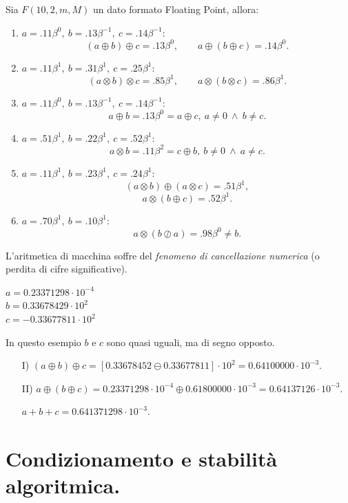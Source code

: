 \begin{exe}
Sia $F(10,2,m,M)$ un dato formato Floating Point, allora:
\begin{enumerate}
\item $a = .11\beta^0,\ b = .13\beta^{-1}, \ c = .14\beta^{-1}$:
\[(a \oplus b) \oplus c = .13\beta^0, \qquad a \oplus (b \oplus c) = .
14\beta^0.\]
\item $a = .11\beta^1,\ b = .31\beta^{1}, \ c = .25\beta^{1}$:
\[(a \otimes b) \otimes c = .85\beta^1, \qquad a \otimes (b \otimes c) = .
86\beta^1.\]
\item $a = .11\beta^0,\ b = .13\beta^{-1}, \ c = .14\beta^{-1}$:
\[a \oplus b = .13\beta^0 = a \oplus c, \ a \neq 0 \ \wedge\ b \neq c.\]
\item $a = .51\beta^1,\ b = .22\beta^{1}, \ c = .52\beta^{1}$:
\[a \otimes b = .11\beta^2 = c \oplus b, \ b \neq 0 \ \wedge\ a \neq c.\]
\item $a = .11\beta^1,\ b = .23\beta^{1}, \ c = .24\beta^{1}$:
\[(a \otimes b) \oplus (a \otimes c) = .51\beta^1,\]
\[a \otimes ( b \oplus c) = .52\beta^1.\]
\item $a = .70\beta^1, \ b = .10\beta^1$:
\[a \otimes (b \oslash a) = .98\beta^0 \neq b.\]
\end{enumerate}
\end{exe}

\begin{osse}L'aritmetica di macchina soffre del \emph{
fenomeno di cancellazione numerica} (o perdita di cifre significative).
\begin{flushleft}
$a = 0.23371298 \cdot 10^{-4}$\\
$b = 0.33678429 \cdot 10^{2}$\\
$c = -0.33677811 \cdot 10^{2}$
\end{flushleft}
In questo esempio $b$ e $c$ sono quasi uguali, ma di segno opposto.
\begin{itemize}
\item[I)]
$(a \oplus b) \oplus c = [0.33678452 \ominus 0.33677811] \cdot 10^2 =
0.64100000 \cdot 10^{-3}$.
\item[II)]
$a \oplus (b \oplus c) = 0.23371298 \cdot 10^{-4} \oplus 0.61800000 \cdot 
10^{-3} = 0.64137126 \cdot 10^{-3}$.

\item[]$a + b + c = 0.641371298 \cdot 10^{-3}$.
\end{itemize}
\end{osse}



\chapter{Condizionamento e stabilità algoritmica.}

